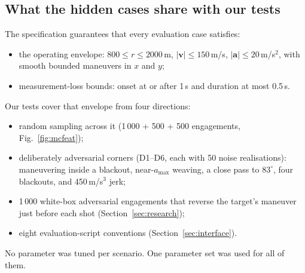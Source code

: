\documentclass[11pt,a4paper]{article}
\begin{document}
\subsection{What the hidden cases share with our tests}
The specification guarantees that every evaluation case satisfies:
\begin{itemize}
\item the operating envelope: $800\le r\le2000$\,m, $|\mathbf v|\le150$\,m/s, $|\mathbf a|\le20$\,m/s$^2$, with smooth bounded maneuvers in $x$ and $y$;
\item measurement-loss bounds: onset at or after 1\,s and duration at most 0.5\,s.
\end{itemize}
Our tests cover that envelope from four directions:
\begin{itemize}
\item random sampling across it (1\,000 + 500 + 500 engagements, Fig.~\ref{fig:mcfeat});
\item deliberately adversarial corners (D1--D6, each with 50 noise realisations): maneuvering inside a blackout, near-$a_{\max}$ weaving, a close pass to $83^\circ$, four blackouts, and 450\,m/s$^3$ jerk;
\item 1\,000 white-box adversarial engagements that reverse the target's maneuver just before each shot (Section~\ref{sec:research});
\item eight evaluation-script conventions (Section~\ref{sec:interface}).
\end{itemize}
No parameter was tuned per scenario. One parameter set was used for all of them.
\end{document}
